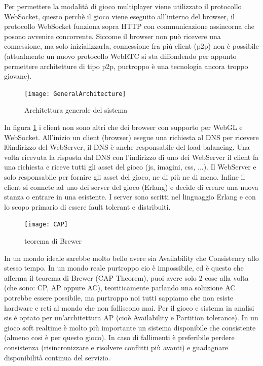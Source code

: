 \documentclass[paper=a4, fontsize=11pt]{scrartcl} %
\numberwithin{equation}{section} %
\numberwithin{figure}{section} %
\numberwithin{table}{section} %
\begin{document}
Per permettere la modalità di gioco multiplayer viene utilizzato il protocollo WebSocket, questo perchè il gioco viene eseguito all'interno del browser, il protocollo WebSocket
funziona sopra HTTP con communicazione assincorna che posono avvenire concorrente.
Siccome il browser non può ricevere una connessione, ma solo inizializzarla, connessione
fra più client (p2p) non è possibile (attualmente un nuovo protocollo WebRTC si sta
diffondendo per appunto permettere architetture di tipo p2p, purtroppo è una tecnologia ancora troppo giovane).

\begin{figure}
\centering
\texttt{[image: GeneralArchitecture]}
\caption{Architettura generale del sistema}
\label{GenArc}
\end{figure}

In figura \ref{GenArc} i client non sono altri che dei browser con supporto per WebGL e WebSocket. All'inizio un client (browser) esegue una richiesta al DNS per ricevere l0indirizzo del WebServer, il DNS è anche responsabile del load balancing. Una volta ricevuta la risposta dal DNS con l'indirizzo di uno dei WebServer il client fa una richiesta e riceve tutti gli asset del gioco (js, imagini, css, ...). Il WebServer e solo responsabile per fornire gli asset del gioco, ne di più ne di meno. Infine il client si connete ad uno dei server del gioco (Erlang) e decide di creare una nuova stanza o entrare in una esistente. I server sono scritti nel linguaggio Erlang e con lo scopo primario di essere fault tolerant e distribuiti.

\begin{figure}[h]
\centering
\texttt{[image: CAP]}
\caption{teorema di Brewer}
\label{CAP}
\end{figure}

In un mondo ideale sarebbe molto bello avere sia Availability che Consistency allo stesso tempo.
In un mondo reale purtroppo cio è impossibile, ed è questo che afferma il teorema di Brewer (CAP Theorem), puoi avere solo 2 cose alla volta (che sono: CP, AP oppure AC), teoriticamente parlando una soluzione AC potrebbe essere possibile, ma purtroppo noi tutti sappiamo che non esiste hardware e reti al mondo che non falliscono mai.
Per il gioco e sistema in analisi sis è optato per un'architettura AP (cioè Availability e Partition tolerance). In un gioco soft realtime è molto più importante un sistema disponibile che consistente (almeno cosi è per questo gioco). In caso di fallimenti è preferibile perdere consistenza (risincronizzare e risolvere conflitti più avanti) e guadagnare disponibilità continua del servizio.
\end{document}
